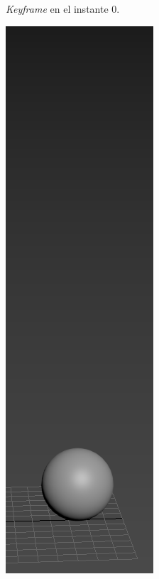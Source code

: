 \documentclass{article}
\begin{document}
\begin{figure}[H]
\begin{subfigure}[H]{0.15\textwidth}
	    \caption{\textit{Keyframe} en el instante 0.}
	\end{subfigure}
    \hfill
    \begin{subfigure}[H]{0.15\textwidth}
	    \centering
	    \includegraphics[width=\textwidth]{imagenes/Ejercicio 2/p2_7.png}

\end{subfigure}
\end{figure}
\end{document}
